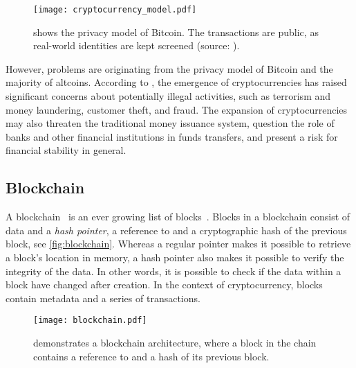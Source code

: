 \begin{figure}[ht]
    \texttt{[image: cryptocurrency\_model.pdf]}
    \caption[Bitcoin's privacy model]{shows the privacy model of Bitcoin. The transactions are public, as real-world identities are kept screened (source: \cite{bitcoin}).}
    \label{fig:cryptocurrency_model}
\end{figure}

However, problems are originating from the privacy model of Bitcoin and the majority of altcoins. According to \cite{bitcoin_regulation}, the emergence of cryptocurrencies has raised significant concerns about potentially illegal activities, such as terrorism and money laundering, customer theft, and fraud. The expansion of cryptocurrencies may also threaten the traditional money issuance system, question the role of banks and other financial institutions in funds transfers, and present a risk for financial stability in general.

\subsection{Blockchain}\label{sec:blockchain}
A blockchain~\cite{bitcoin_book} is an ever growing list of blocks~\cite{bitcoin_book}. Blocks in a blockchain consist of data and a \emph{hash pointer}, a reference to and a cryptographic hash of the previous block, see \autoref{fig:blockchain}. Whereas a regular pointer makes it possible to retrieve a block's location in memory, a hash pointer also makes it possible to verify the integrity of the data. In other words, it is possible to check if the data within a block have changed after creation. In the context of cryptocurrency, blocks contain metadata and a series of transactions.

\begin{figure}[ht]
    \texttt{[image: blockchain.pdf]}
    \caption[Architecture - Blockchain]{demonstrates a blockchain architecture, where a block in the chain contains a reference to and a hash of its previous block.}
    \label{fig:blockchain}
\end{figure}

